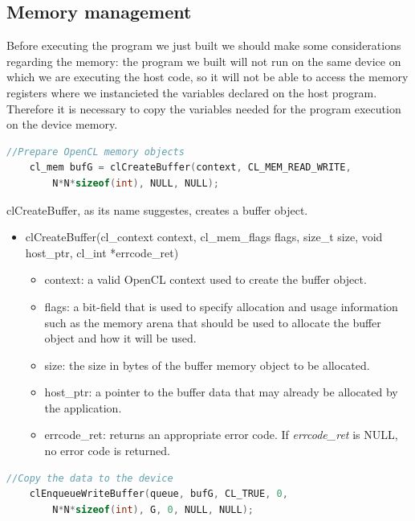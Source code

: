 \documentclass[titlepage]{article}
\begin{document}
\subsection{Memory management}

Before executing the program we just built we should make some considerations regarding the memory: the program we built will not run on the same device on which we are executing the host code, so it will not be able to access the memory registers where we instancieted the variables declared on the host program. Therefore it is necessary to copy the variables needed for the program execution on the device memory.

\begin{minipage}{\linewidth}
\begin{lstlisting}[language=C, style=customc, breaklines=true]
    //Prepare OpenCL memory objects
    cl_mem bufG = clCreateBuffer(context, CL_MEM_READ_WRITE,
        N*N*sizeof(int), NULL, NULL);
\end{lstlisting}
\end{minipage}

clCreateBuffer, as its name suggestes, creates a buffer object.

\begin{itemize}
    \item clCreateBuffer(cl\_context context, cl\_mem\_flags flags, size\_t size, void \newline *host\_ptr, cl\_int *errcode\_ret)
    \begin{itemize}
        \item context: a valid OpenCL context used to create the buffer object.
        \item flags: a bit-field that is used to specify allocation and usage information such as the memory arena that should be used to allocate the buffer object and how it will be used.
        \item size: the size in bytes of the buffer memory object to be allocated.
        \item host\_ptr: a pointer to the buffer data that may already be allocated by the application.
        \item errcode\_ret: returns an appropriate error code. If \textit{errcode\_ret} is NULL, no error code is returned.
    \end{itemize}
\end{itemize}

\begin{minipage}{\linewidth}
\begin{lstlisting}[language=C, style=customc, breaklines=true]
    //Copy the data to the device
    clEnqueueWriteBuffer(queue, bufG, CL_TRUE, 0,
        N*N*sizeof(int), G, 0, NULL, NULL);
\end{lstlisting}
\end{minipage}
\end{document}
